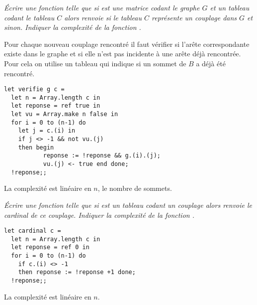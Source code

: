 \begin{Exercise}\it
Écrire une fonction  telle que si  est une matrice codant le graphe $G$ et  un tableau codant le tableau $C$ alors  renvoie  si le tableau $C$ représente un couplage dans $G$ et  sinon.
Indiquer la complexité de la fonction .
\end{Exercise}
\begin{Answer}
Pour chaque nouveau couplage rencontré il faut vérifier si l'arête correspondante existe dans le graphe et si elle n'est pas incidente à une arête déjà rencontrée. Pour cela on utilise un tableau  qui indique si un sommet de $B$ a déjà été rencontré.
\newpage
\begin{lstlisting}
let verifie g c =
  let n = Array.length c in
  let reponse = ref true in
  let vu = Array.make n false in
  for i = 0 to (n-1) do
    let j = c.(i) in
    if j <> -1 && not vu.(j)
    then begin
           reponse := !reponse && g.(i).(j);
           vu.(j) <- true end done;
  !reponse;;
\end{lstlisting}
La complexité est linéaire en $n$, le nombre de sommets.
\end{Answer}
\begin{Exercise}\it
Écrire une fonction  telle que si  est un tableau codant un couplage alors  renvoie le cardinal de ce couplage.
Indiquer la complexité de la fonction .
\end{Exercise}
\begin{Answer}
\begin{lstlisting}
let cardinal c = 
  let n = Array.length c in
  let reponse = ref 0 in
  for i = 0 to (n-1) do
    if c.(i) <> -1
    then reponse := !reponse +1 done;
  !reponse;;
\end{lstlisting}
La complexité est linéaire en $n$.
\end{Answer}
